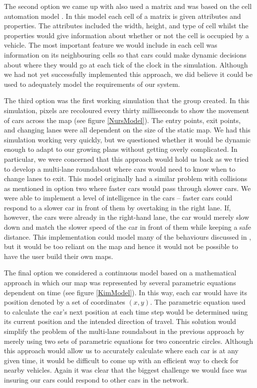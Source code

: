 \documentclass{article}
\begin{document}
	The second option we came up with also used a matrix and was based on the cell automation model \cite{namekawa2005general}. In this model each cell of a matrix is given attributes and properties. The attributes included the width, height, and type of cell whilst the properties would give information about whether or not the cell is occupied by a vehicle. The most important feature we would include in each cell was information on its neighbouring cells so that cars could make dynamic decisions about where they would go at each tick of the clock in the simulation. Although we had not yet successfully implemented this approach, we did believe it could be used to adequately model the requirements of our system. 
	
	The third option was the first working simulation that the group created. In this simulation, pixels are recoloured every thirty milliseconds to show the movement of cars across the map ({see figure \ref{NursModel}}). The entry points, exit points, and changing lanes were all dependent on the size of the static map. We had this simulation working very quickly, but we questioned whether it would be dynamic enough to adapt to our growing plans without getting overly complicated. In particular, we were concerned that this approach would hold us back as we tried to develop a multi-lane roundabout where cars would need to know when to change lanes to exit. This model originally had a similar problem with collisions as mentioned in option two where faster cars would pass through slower cars. We were able to implement a level of intelligence in the cars -- faster cars could respond to a slower car in front of them by overtaking in the right lane. If, however, the cars were already in the right-hand lane, the car would merely slow down and match the slower speed of the car in front of them while keeping a safe distance. This implementation could model many of the behaviours discussed in \cite{ehlert2001microscopic}, but it would be too reliant on the map and hence it would not be possible to have the user build their own maps. 
	
	The final option we considered a continuous model based on a mathematical approach in which our map was represented by several parametric equations dependent on time ({see figure \ref{KimModel}}). In this way, each car would have its position denoted by a set of coordinates $(x,y)$. The parametric equation used to calculate the car's next position at each time step would be determined using its current position and the intended direction of travel. This solution would simplify the problem of the  multi-lane roundabout in the previous approach by merely using two sets of parametric equations for two concentric circles. Although this approach would allow us to accurately calculate where each car is at any given time, it would be difficult to come up with an efficient way to check for nearby vehicles. Again it was clear that the biggest challenge we would face was insuring our cars could respond to other cars in the network. 
	
\end{document}
